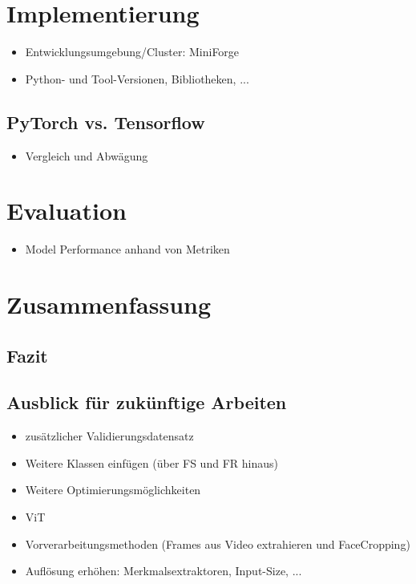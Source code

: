 \documentclass{article}
\begin{document}
    \newpage
    \section{Implementierung}
    \begin{itemize}
        \item Entwicklungsumgebung/Cluster: MiniForge
        \item Python- und Tool-Versionen, Bibliotheken, ... %
    \end{itemize}
    \subsection{PyTorch vs. Tensorflow}
    \begin{itemize}
        \item Vergleich und Abwägung
    \end{itemize}
    \section{Evaluation}
    \begin{itemize}
        \item Model Performance anhand von Metriken
    \end{itemize}

    \section{Zusammenfassung}
    \subsection{Fazit}
    \subsection{Ausblick für zukünftige Arbeiten}
    \begin{itemize}
        \item zusätzlicher Validierungsdatensatz %
        \item Weitere Klassen einfügen (über FS und FR hinaus)
        \item Weitere Optimierungsmöglichkeiten
        \item ViT
        \item Vorverarbeitungsmethoden (Frames aus Video extrahieren und FaceCropping)
        \item Auflösung erhöhen: Merkmalsextraktoren, Input-Size, ...
    \end{itemize}
\end{document}
